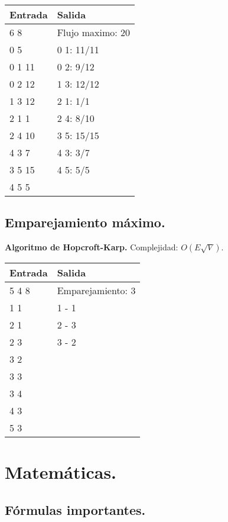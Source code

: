 \documentclass[10pt, letterpaper, twoside]{article}
\begin{document}


\begin{tabular}{|p{7cm}|p{7cm}|}
\hline
\textbf{Entrada} & \textbf{Salida} \\ \hline
6 8    & Flujo maximo: 20 \\
0 5    & 0 1: 11/11 \\ 
0 1 11 & 0 2: 9/12  \\
0 2 12 & 1 3: 12/12 \\
1 3 12 & 2 1: 1/1 \\
2 1 1  & 2 4: 8/10 \\
2 4 10 & 3 5: 15/15 \\
4 3 7  & 4 3: 3/7 \\
3 5 15 & 4 5: 5/5 \\
4 5 5  & \\ \hline
\end{tabular}

\subsection{Emparejamiento máximo.}

\textbf{Algoritmo de Hopcroft-Karp.} Complejidad: $O(E \sqrt{V})$.



\begin{tabular}{|p{7cm}|p{7cm}|}
\hline
\textbf{Entrada} & \textbf{Salida} \\ \hline
5 4 8 & Emparejamiento: 3 \\
1 1   & 1 - 1 \\
2 1   & 2 - 3 \\
2 3   & 3 - 2 \\
3 2   & \\
3 3   & \\
3 4   & \\
4 3   & \\
5 3   & \\ \hline
\end{tabular}

\newpage

\section{Matemáticas.}

\subsection{Fórmulas importantes.}
\end{document}
